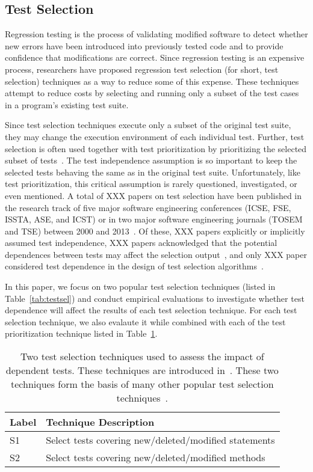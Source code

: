 \subsection{Test Selection}
\label{sec:backgroundsel}

Regression testing is the process of validating modified
software to detect whether new errors
have been introduced into previously tested code and
to provide confidence that modifications
are correct. Since regression testing is an expensive process,
researchers have proposed regression test selection (for short,
test selection) techniques as a way to reduce some of this expense.
These techniques attempt to reduce costs by selecting and running
only a subset of the test cases in a program's existing test suite.


Since test selection techniques execute only a subset of the original
test suite, they may change the execution environment
of each individual test. 
Further, test selection is often used together with
test prioritization by prioritizing the selected
subset of tests~\cite{}. The test independence assumption
is so important to keep the selected tests behaving the
same as in the original test suite. Unfortunately,
like test prioritization, this critical assumption is
rarely questioned, investigated, or even mentioned.
A total of XXX papers on test selection have been  
published in the research track of five major software
engineering conferences
(ICSE, FSE, ISSTA, ASE, and ICST) or in two major
software engineering journals
(TOSEM and TSE) between 2000 and 2013~\cite{alltestprior}.
Of these,
XXX papers explicitly or implicitly assumed test independence,
XXX papers acknowledged that the potential dependences between tests
may affect the selection output~\cite{},
and only XXX paper considered test dependence in the design of
test selection algorithms~\cite{}.


In this paper, we focus on two popular test selection techniques (listed
in Table~\ref{tab:testsel}) and conduct empirical evaluations
to investigate whether test dependence will affect the results of
each test selection technique. For each test selection technique,
we also evalaute it while combined with each of the test
prioritization technique listed in Table~\ref{tab:testprio}.

\begin{table}
\centering
\setlength{\tabcolsep}{0.25\tabcolsep}
\begin{tabular}{|l|l|}
\hline
\textbf{Label} & \textbf{Technique Description} \\
\hline
S1 & Select tests covering new/deleted/modified statements\\
S2 & Select tests covering new/deleted/modified methods\\
\hline
\end{tabular}
\caption{Two test selection techniques used
to assess the impact of dependent tests. These
techniques are introduced in~\cite{}. These
two techniques form the basis of many other
popular test selection techniques~\cite{}.
}
\label{tab:testprio}
\end{table}



